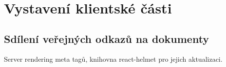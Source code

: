 
\section{Vystavení klientské části}\label{sec:vystaveníKlientskéČásti}

\subsection{Sdílení veřejných odkazů na dokumenty}\label{subsec:sdíleníVeřejnýchOdkazůNaDokumenty}

Server rendering meta tagů, knihovna react-helmet pro jejich aktualizaci.
